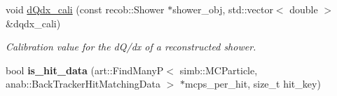 \begin{DoxyCompactItemize}
void \hyperlink{group__lee_ga4926738bfba2d91bc187ad8a7db6e997}{d\-Qdx\-\_\-cali} (const recob\-::\-Shower $\ast$shower\-\_\-obj, std\-::vector$<$ double $>$ \&dqdx\-\_\-cali)
\begin{DoxyCompactList}\small\item\em Calibration value for the d\-Q/dx of a reconstructed shower. \end{DoxyCompactList}\item 
\hypertarget{group__lee_ga21b60eb8e5ccee6f04a795d319d5c0ee}{bool {\bfseries is\-\_\-hit\-\_\-data} (art\-::\-Find\-Many\-P$<$ simb\-::\-M\-C\-Particle, anab\-::\-Back\-Tracker\-Hit\-Matching\-Data $>$ $\ast$mcps\-\_\-per\-\_\-hit, size\-\_\-t hit\-\_\-key)}\label{group__lee_ga21b60eb8e5ccee6f04a795d319d5c0ee}

\end{DoxyCompactItemize}
